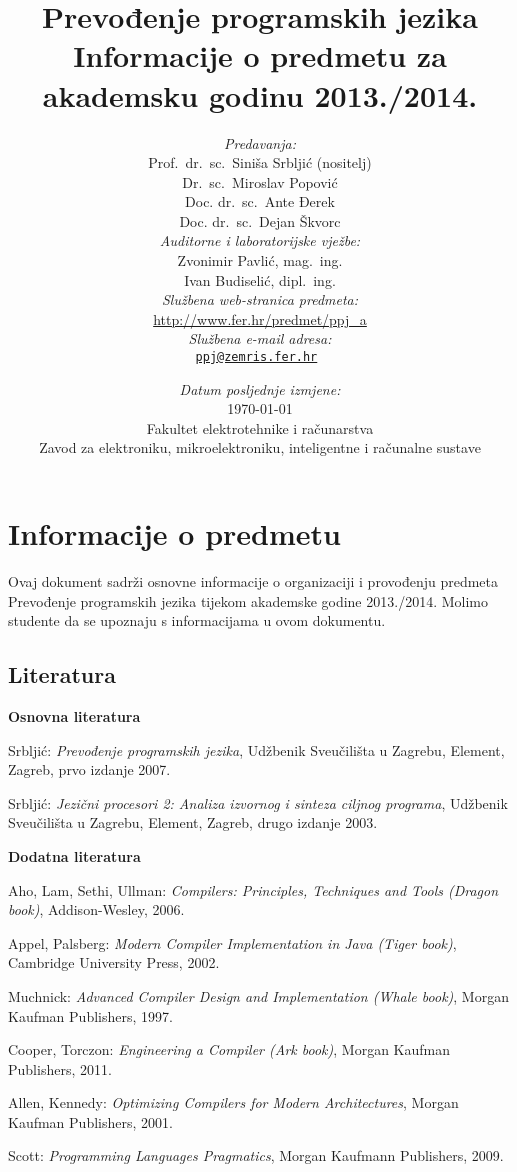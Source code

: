 \documentclass[times, 12pt, utf8]{book}
\title{
\vfill
\textbf{Prevođenje programskih jezika}\\
\vspace{30pt}
Informacije o predmetu za akademsku godinu 2013./2014. \\
\vspace{40pt}
}
\author{
\emph{Predavanja:} \\
Prof.~dr.~sc.~Siniša Srbljić (nositelj) \\
Dr.~sc.~Miroslav Popović \\
Doc. dr.~sc.~Ante Đerek \\
\vspace{30pt}
Doc. dr.~sc.~Dejan Škvorc \\
\emph{Auditorne i laboratorijske vježbe:} \\
Zvonimir Pavlić, mag.~ing. \\
\vspace{30pt}
Ivan Budiselić, dipl.~ing. \\
\emph{Službena web-stranica predmeta:} \\
\vspace{30pt}
\url{http://www.fer.hr/predmet/ppj_a} \\
\emph{Službena e-mail adresa:} \\
\tt{\href{mailto:ppj@zemris.fer.hr}{ppj@zemris.fer.hr}}
}
\date{
\vspace{30pt} 
\emph{Datum posljednje izmjene:} \\
\today \\
\vfill
Fakultet elektrotehnike i računarstva \\
Zavod za elektroniku, mikroelektroniku, inteligentne i računalne sustave
}
\begin{document}
\maketitle

\section*{Informacije o predmetu}

Ovaj dokument sadrži osnovne informacije o organizaciji i provođenju predmeta Prevođenje programskih jezika tijekom akademske godine 2013./2014. 
Molimo studente da se upoznaju s informacijama u ovom dokumentu.

\let\cleardoublepage\relax
{}

\tableofcontents

\cleardoublepage  
{}  
{}  
\subsection*{Literatura}

\textbf{Osnovna literatura}

Srbljić: \textit{Prevođenje programskih jezika}, Udžbenik Sveučilišta u Zagrebu, Element, Zagreb, prvo izdanje 2007.

Srbljić: \textit{Jezični procesori 2: Analiza izvornog i sinteza ciljnog programa}, Udžbenik Sveučilišta u Zagrebu, Element, Zagreb, drugo izdanje 2003.

\textbf{Dodatna literatura}

Aho, Lam, Sethi, Ullman: \textit{Compilers: Principles, Techniques and Tools (Dragon book)}, Addison-Wesley, 2006. 

Appel, Palsberg: \textit{Modern Compiler Implementation in Java (Tiger book)}, Cambridge University Press, 2002.

Muchnick: \textit{Advanced Compiler Design and Implementation (Whale book)}, Morgan Kaufman Publishers, 1997.

Cooper, Torczon: \textit{Engineering a Compiler (Ark book)}, Morgan Kaufman Publishers, 2011.

Allen, Kennedy: \textit{Optimizing Compilers for Modern Architectures}, Morgan Kaufman Publishers, 2001.

Scott: \textit{Programming Languages Pragmatics}, Morgan Kaufmann Publishers, 2009.

\cleardoublepage  
{}
{}
\end{document}
